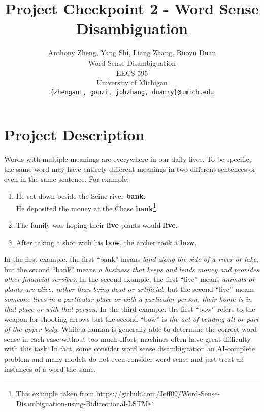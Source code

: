 \documentclass[11pt,letterpaper]{article}
\title{Project Checkpoint 2 - Word Sense Disambiguation}
\author{Anthony Zheng, Yang Shi, Liang Zhang, Ruoyu Duan\\
      Word Sense Disambiguation\\
      EECS 595\\
	    University of Michigan\\
	    {\tt \{zhengant, gouzi, johzhang, duanry\}@umich.edu}
}
\date{}
\begin{document}
\maketitle

\section{Project Description}
Words with multiple meanings are everywhere in our daily lives. To be specific, the same word may have entirely different meanings in two different sentences or even in the same sentence. For example: 
\begin{enumerate}
  \item He sat down beside the Seine river \textbf{bank}.\\
  He deposited the money at the Chase \textbf{bank}\footnote{This example taken from https://github.com/Jeff09/Word-Sense-Disambiguation-using-Bidirectional-LSTM}.
  \item The family was hoping their \textbf{live} plants would \textbf{live}.
  \item After taking a shot with his \textbf{bow}, the archer took a \textbf{bow}. 
\end{enumerate}
In the first example, the first ``bank'' means \textit{land along the side of a river or lake}, but the second ``bank'' means \textit{a business that keeps and lends money and provides other financial services}. In the second example, the first ``live'' means \textit{animals or plants are alive, rather than being dead or artificial},  but the second ``live'' means \textit{someone lives in a particular place or with a particular person, their home is in that place or with that person}. In the third example, the first ``bow'' refers to the weapon for shooting arrows but the second ``bow'' is \textit{the act of bending all or part of the upper body}. While a human is generally able to determine the correct word sense in each case without too much effort, machines often have great difficulty with this task. In fact, some consider word sense disambiguation an AI-complete problem and many models do not even consider word sense and just treat all instances of a word the same.
\end{document}
